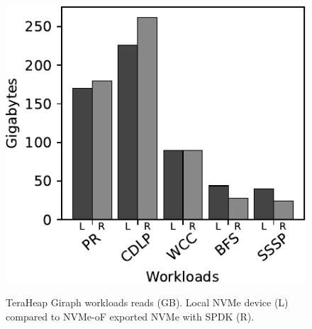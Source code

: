 \begin{figure}[H]
  \includegraphics[width=\linewidth]{figures/giraph_r.pdf}\\
\caption{TeraHeap Giraph workloads reads (GB). Local NVMe device (L) compared to NVMe-oF exported NVMe with SPDK (R).}
\label{fig:giraph_r}
\end{figure}


